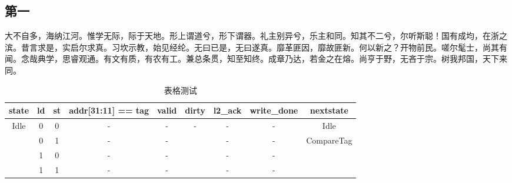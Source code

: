 \documentclass{source/Paper}
\begin{document}
            \subsection{第一}
            大不自多，海纳江河。惟学无际，际于天地。形上谓道兮，形下谓器。礼主别异兮，乐主和同。知其不二兮，尔听斯聪！国有成均，在浙之滨。昔言求是，实启尔求真。习坎示教，始见经纶。无曰已是，无曰遂真。靡革匪因，靡故匪新。何以新之？开物前民。嗟尔髦士，尚其有闻。念哉典学，思睿观通。有文有质，有农有工。兼总条贯，知至知终。成章乃达，若金之在熔。尚亨于野，无吝于宗。树我邦国，天下来同。
            \begin{table}[H]
                \centering
                \caption{表格测试}
                \begin{tabular}{|c|c|c|c|c|c|c|c|c|}
                \hline
                state                 & ld & st & addr{[}31:11{]} == tag & valid & dirty & l2\_ack & write\_done & nextstate                   \\ \hline
                \multirow{4}{*}{Idle} & 0  & 0  & -                      & -     & -     & -       & -           & Idle                        \\ \cline{2-9} 
                                    & 0  & 1  & -                      & -     &       & -       & -           & \multirow{3}{*}{CompareTag} \\ \cline{2-8}
                                    & 1  & 0  & -                      & -     &       & -       & -           &                             \\ \cline{2-8}
                                    & 1  & 1  & -                      & -     &       & -       & -           &                             \\ \hline
            \end{tabular}
            \end{table}
\end{document}
